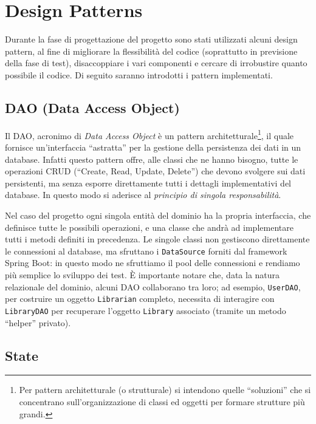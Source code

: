 \documentclass[
  italian,
  paper=a4,
  ,captions=tableheading
]{scrbook}
\newcommand{\passthrough}[1]{#1}
\begin{document}
\section{Design Patterns}\label{design-patterns}

Durante la fase di progettazione del progetto sono stati utilizzati
alcuni design pattern, al fine di migliorare la flessibilità del codice
(soprattutto in previsione della fase di test), disaccoppiare i vari
componenti e cercare di irrobustire quanto possibile il codice. Di
seguito saranno introdotti i pattern implementati.

\subsection{DAO (Data Access Object)}\label{dao-data-access-object}

Il DAO, acronimo di \emph{Data Access Object} è un pattern
architetturale\footnote{Per pattern architetturale (o strutturale) si intendono quelle “soluzioni” che si concentrano sull’organizzazione di classi ed oggetti per formare strutture più grandi.},
il quale fornisce un'interfaccia ``astratta'' per la gestione della
persistenza dei dati in un database. Infatti questo pattern offre, alle
classi che ne hanno bisogno, tutte le operazioni CRUD (``Create, Read,
Update, Delete'') che devono svolgere sui dati persistenti, ma senza
esporre direttamente tutti i dettagli implementativi del database. In
questo modo si aderisce al \emph{principio di singola responsabilità}.

Nel caso del progetto ogni singola entità del dominio ha la propria
interfaccia, che definisce tutte le possibili operazioni, e una classe
che andrà ad implementare tutti i metodi definiti in precedenza. Le
singole classi non gestiscono direttamente le connessioni al database,
ma sfruttano i \passthrough{\lstinline!DataSource!} forniti dal
framework Spring Boot: in questo modo ne sfruttiamo il pool delle
connessioni e rendiamo più semplice lo sviluppo dei test. È importante
notare che, data la natura relazionale del dominio, alcuni DAO
collaborano tra loro; ad esempio, \passthrough{\lstinline!UserDAO!}, per
costruire un oggetto \passthrough{\lstinline!Librarian!} completo,
necessita di interagire con \passthrough{\lstinline!LibraryDAO!} per
recuperare l'oggetto \passthrough{\lstinline!Library!} associato
(tramite un metodo ``helper'' privato).

\subsection{State}\label{state}
\end{document}
